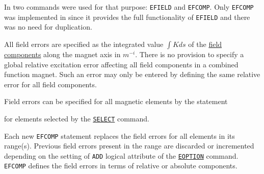 In \madeight two commands were used for that purpose: {\tt EFIELD} 
and {\tt EFCOMP}.
Only {\tt EFCOMP} was implemented in \madx since it provides the full 
functionality
of {\tt EFIELD} and there was no need for duplication.  

All field errors are specified as the integrated value $\int K ds$ 
of the \hyperref[sec:sign-convention]{field components} along the magnet axis 
in $m^{-i}$. There is no provision
to specify a global relative excitation error affecting all field
components in a combined function magnet. Such an error may only be
entered by defining the same relative error for all field components.  

Field errors can be specified for all magnetic elements by the statement  


for elements selected by the
\hyperref[sec:select]{\tt SELECT} command.

Each new {\tt EFCOMP} statement replaces the field errors for all
elements in its range(s). Previous field errors present in the range are
discarded or incremented depending on the setting of
{\tt ADD} logical attribute of the \hyperref[sec:eoption]{\tt EOPTION} command. 
{\tt EFCOMP} defines the field errors in terms of
relative or absolute components.

